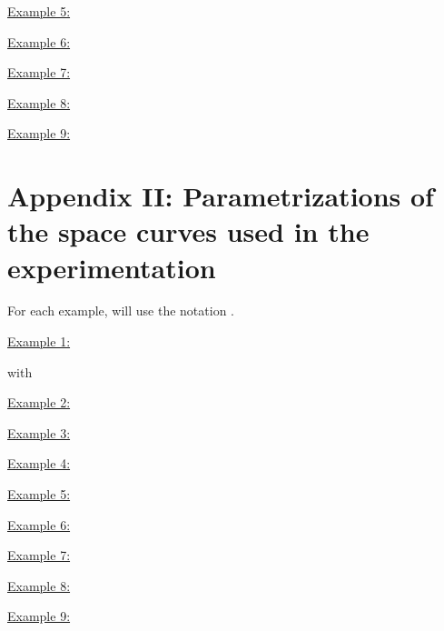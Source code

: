 \documentclass{elsart}
\begin{document}
\underline{Example 5:}




\underline{Example 6:}




\underline{Example 7:}



\underline{Example 8:}



\underline{Example 9:}




\section*{Appendix II: Parametrizations of the space curves used in
the experimentation}\label{appen-2}

For each example, will use the notation
.

\underline{Example 1:}







with


\underline{Example 2:}







\underline{Example 3:}





\underline{Example 4:}




\underline{Example 5:}







\underline{Example 6:}



\underline{Example 7:}







\underline{Example 8:}







\underline{Example 9:}
\end{document}
